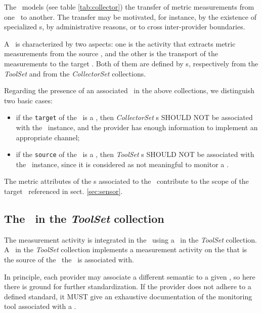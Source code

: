 \documentclass[12pt]{article}  %
\begin{document}
{

The \coll\ models  (see table \ref{tab:collector}) the transfer of metric measurements from one \rs\ to another. The transfer may be motivated, for instance, by the existence of specialized \rs s, by administrative reasons, or to cross inter-provider boundaries.

A \coll\ is characterized by two aspects: one is the activity that extracts metric measurements from the source \rs, and the other is the transport of the measurements to the target \rs. Both of them are defined by \mi s, respectively from the {\em ToolSet} and from the {\em CollectorSet} collections.

Regarding the presence of an associated \mi\ in the above collections, we distinguish two basic cases:

\begin{itemize}

\item if the {\tt target} of the \coll\ is a \sens, then {\em CollectorSet} \mi s SHOULD NOT be associated with the \coll\ instance, and the provider has enough information to implement an appropriate channel;

\item if the {\tt source} of the \coll\ is a \sens, then {\em ToolSet} \mi s SHOULD NOT be associated with the \coll\ instance, since it is considered as not meaningful to monitor a \sens.

\end{itemize}

The metric attributes of the \mi s associated to the \coll\ contribute to the scope of the target \sens\ referenced in sect. \ref{sec:sensor}.

\subsection{The \mi\ in the {\em ToolSet} collection}

The measurement activity is integrated in the \coll\ using a \mi\ in the {\em ToolSet} collection. A \mi\ in the {\em ToolSet} collection implements a measurement activity on the \rs that is the source of the \sens\ the \mi\ is associated with.

In principle, each provider may associate a different semantic to a given \mi, so here there is ground for further standardization. If the provider does not adhere to a defined standard, it MUST give an exhaustive documentation of the monitoring tool associated with a \mi.

}
\end{document}
